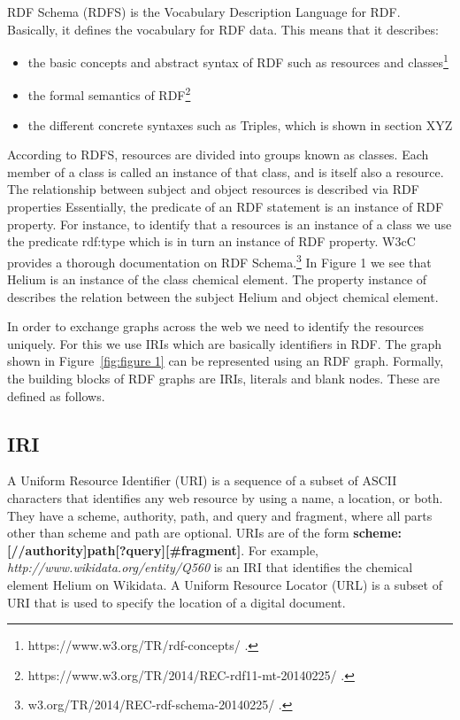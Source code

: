 RDF Schema (RDFS) is the Vocabulary Description Language for RDF. Basically, it defines the vocabulary for RDF data. This means that it describes:

\begin{itemize}
	\item the basic concepts and abstract syntax of RDF such as resources and classes\footnote{https://www.w3.org/TR/rdf-concepts/ .}
	\item the formal semantics of RDF\footnote{https://www.w3.org/TR/2014/REC-rdf11-mt-20140225/ .}
	\item the different concrete syntaxes such as Triples, which is shown in section XYZ
\end{itemize}

According to RDFS, resources are divided into groups known as classes. Each member of a class is called an instance of that class, and is itself also a resource. The relationship between subject and object resources is described via RDF properties Essentially, the predicate of an RDF statement is an instance of RDF property. For instance, to identify that a resources is an instance of a class we use the predicate rdf:type which is in turn an instance of RDF property. W3cC provides a thorough documentation on RDF Schema.\footnote{w3.org/TR/2014/REC-rdf-schema-20140225/ .} In Figure 1 we see that Helium is an instance of the class chemical element. The property instance of describes the relation between the subject Helium and object chemical element.

In order to exchange graphs across the web we need to identify the resources uniquely. For this we use IRIs which are basically identifiers in RDF. The graph shown in Figure~\ref{fig:figure 1} can be represented using an RDF graph. Formally, the building blocks of RDF graphs are IRIs, literals and blank nodes. These are defined as follows.

\subsection*{IRI}
A Uniform Resource Identifier (\acrshort{URI}) is a sequence of a subset of ASCII characters that identifies any web resource by using a name, a location, or both. They have a scheme, authority, path, and query and fragment, where all parts other than scheme and path are optional. URIs are of the form \textbf{scheme:[//authority]path[?query][\#fragment]}. For example, \textit{http://www.wikidata.org/entity/Q560} is an IRI that identifies the chemical element Helium on Wikidata. A Uniform Resource Locator (\acrshort{URL}) is a subset of URI that is used to specify the location of a digital document.

